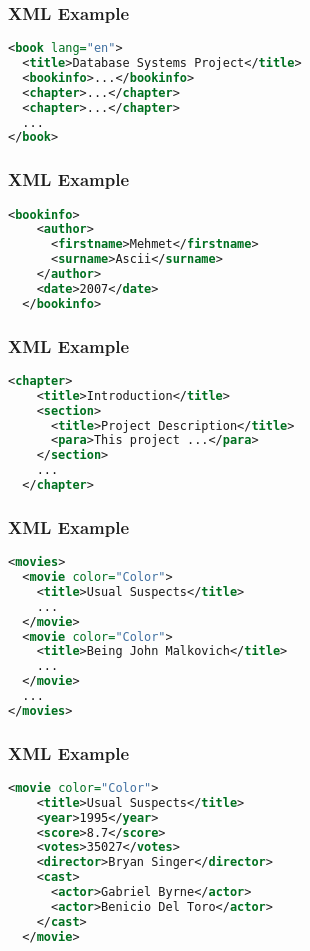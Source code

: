\documentclass[dvipsnames]{beamer}
\theoremstyle{plain}
\begin{document}
\begin{frame}[fragile]
  \frametitle{XML Example}

  \begin{example}[DocBook]
    \begin{lstlisting}[language=XML]
<book lang="en">
  <title>Database Systems Project</title>
  <bookinfo>...</bookinfo>
  <chapter>...</chapter>
  <chapter>...</chapter>
  ...
</book>
    \end{lstlisting}
  \end{example}
\end{frame}

\begin{frame}[fragile]
  \frametitle{XML Example}

  \begin{example}[DocBook]
    \begin{lstlisting}[language=XML]
  <bookinfo>
    <author>
      <firstname>Mehmet</firstname>
      <surname>Ascii</surname>
    </author>
    <date>2007</date>
  </bookinfo>
    \end{lstlisting}
  \end{example}
\end{frame}

\begin{frame}[fragile]
  \frametitle{XML Example}

  \begin{example}[DocBook]
    \begin{lstlisting}[language=XML]
  <chapter>
    <title>Introduction</title>
    <section>
      <title>Project Description</title>
      <para>This project ...</para>
    </section>
    ...
  </chapter>
    \end{lstlisting}
  \end{example}
\end{frame}

\begin{frame}[fragile]
  \frametitle{XML Example}

  \begin{example}[Movies]
    \begin{lstlisting}[language=XML]
<movies>
  <movie color="Color">
    <title>Usual Suspects</title>
    ...
  </movie>
  <movie color="Color">
    <title>Being John Malkovich</title>
    ...
  </movie>
  ...
</movies>
    \end{lstlisting}
  \end{example}
\end{frame}

\begin{frame}[fragile]
  \frametitle{XML Example}

  \begin{example}[Movies]
    \begin{lstlisting}[language=XML]
  <movie color="Color">
    <title>Usual Suspects</title>
    <year>1995</year>
    <score>8.7</score>
    <votes>35027</votes>
    <director>Bryan Singer</director>
    <cast>
      <actor>Gabriel Byrne</actor>
      <actor>Benicio Del Toro</actor>
    </cast>
  </movie>
    \end{lstlisting}
  \end{example}
\end{frame}
\end{document}
